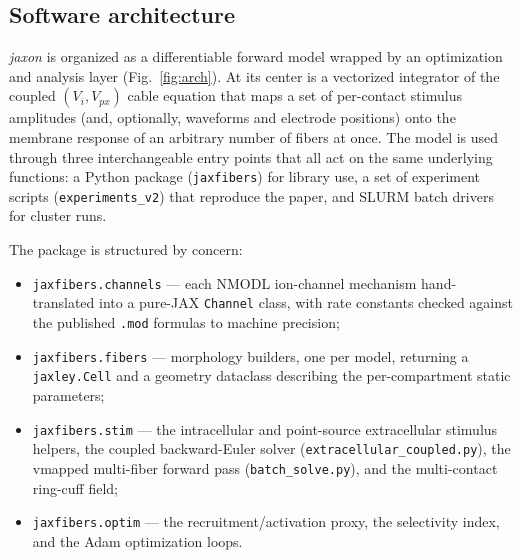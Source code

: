 \documentclass[preprint,12pt,a4paper]{elsarticle}
\begin{document}
\subsection{Software architecture}

\emph{jaxon} is organized as a differentiable forward model wrapped by an optimization and
analysis layer (Fig.~\ref{fig:arch}). At its center is a vectorized integrator of the coupled
$(V_i, V_{px})$ cable equation that maps a set of per-contact stimulus amplitudes (and,
optionally, waveforms and electrode positions) onto the membrane response of an arbitrary
number of fibers at once. The model is used through three interchangeable entry points that
all act on the same underlying functions: a Python package (\texttt{jaxfibers}) for library
use, a set of experiment scripts (\texttt{experiments\_v2}) that reproduce the paper, and
SLURM batch drivers for cluster runs.

The package is structured by concern:
\begin{itemize}
  \item \texttt{jaxfibers.channels} --- each NMODL ion-channel mechanism hand-translated into
        a pure-JAX \texttt{Channel} class, with rate constants checked against the published
        \texttt{.mod} formulas to machine precision;
  \item \texttt{jaxfibers.fibers} --- morphology builders, one per model, returning a
        \texttt{jaxley.Cell} and a geometry dataclass describing the per-compartment static
        parameters;
  \item \texttt{jaxfibers.stim} --- the intracellular and point-source extracellular stimulus
        helpers, the coupled backward-Euler solver
        (\texttt{extracellular\_coupled.py}), the vmapped multi-fiber forward pass
        (\texttt{batch\_solve.py}), and the multi-contact ring-cuff field;
  \item \texttt{jaxfibers.optim} --- the recruitment/activation proxy, the selectivity index,
        and the Adam optimization loops.
\end{itemize}
\end{document}
